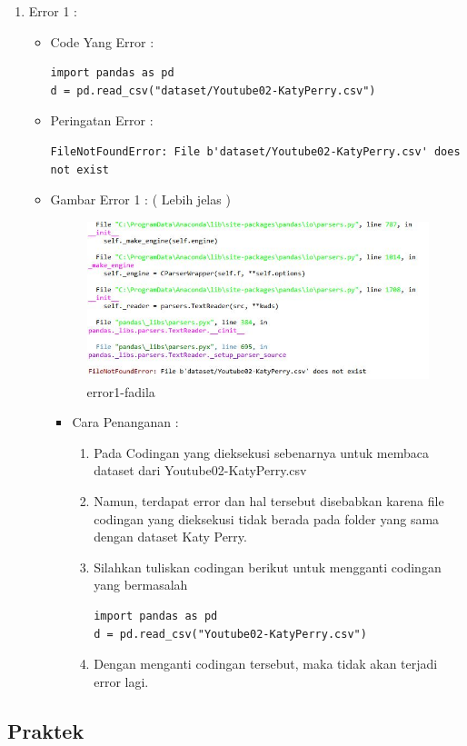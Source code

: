 \begin{enumerate}
\item Error 1 :
\begin{itemize} 
\item Code Yang Error :
\begin{lstlisting}
import pandas as pd
d = pd.read_csv("dataset/Youtube02-KatyPerry.csv")
\end{lstlisting}
\item Peringatan Error :
\begin{lstlisting}
FileNotFoundError: File b'dataset/Youtube02-KatyPerry.csv' does not exist
\end{lstlisting}
\item Gambar Error 1 : ( Lebih jelas )
\begin{figure}[!hbtp]
\centering
\includegraphics[scale=0.3]{figures/e1-fadila.jpg}
\caption{error1-fadila}
\label{error1-fadila}
\end{figure}
\begin{itemize}
\item Cara Penanganan :
\begin{enumerate}
\item Pada Codingan yang dieksekusi sebenarnya untuk membaca dataset dari Youtube02-KatyPerry.csv
\item Namun, terdapat error dan hal tersebut disebabkan karena file codingan yang dieksekusi tidak berada pada folder yang sama dengan dataset Katy Perry.
\item Silahkan tuliskan codingan berikut untuk mengganti codingan yang bermasalah
\begin{lstlisting}
import pandas as pd
d = pd.read_csv("Youtube02-KatyPerry.csv")
\end{lstlisting}
\item Dengan menganti codingan tersebut, maka tidak akan terjadi error lagi.
\par
\par
\end{enumerate}
\end{itemize}
\end{itemize}
\end{enumerate}


\subsection{Praktek}